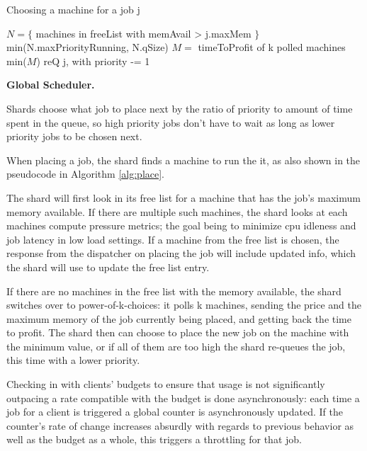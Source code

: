 \begin{algorithm}[t]
\caption{Choosing a machine for a job j}\label{alg:place}
\begin{algorithmic}
    \State$N = \{ $ machines in freeList with memAvail > j.maxMem $\}$
     \\
        \Return$ $min(N.maxPriorityRunning, N.qSize)
    \EndIf
    \State$M = $ timeToProfit of k polled machines
     \\
        \Return$ $min($M$)
    \Else
        \State$ $reQ j, with priority -= 1
    \EndIf
\end{algorithmic}
\end{algorithm}


\textbf{Global Scheduler.}

Shards choose what job to place next by the ratio of priority to amount of time
spent in the queue, so high priority jobs don't have to wait as long as lower
priority jobs to be chosen next.

When placing a job, the shard finds a machine to run the it, as also shown in
the pseudocode in Algorithm \ref{alg:place}. 

The shard will first look in its free list for a machine that has the job's
maximum memory available. If there are multiple such machines, the shard looks
at each machines compute pressure metrics; the goal being to minimize cpu
idleness and job latency in low load settings. If a machine from the free list is chosen, the
response from the dispatcher on placing the job will include updated info,
which the shard will use to update the free list entry.

If there are no machines in the free list with the memory available, the shard
switches over to power-of-k-choices: it polls k machines, sending the price and
the maximum memory of the job currently being placed, and getting back the time
to profit. The shard then can choose to place the new job on the machine with
the minimum value, or if all of them are too high the shard re-queues the job,
this time with a lower priority.

Checking in with clients' budgets to ensure that usage is not significantly
outpacing a rate compatible with the budget is done asynchronously: each time a
job for a client is triggered a global counter is asynchronously updated. If the
counter's rate of change increases absurdly with regards to previous behavior as
well as the budget as a whole, this triggers a throttling for that job.
